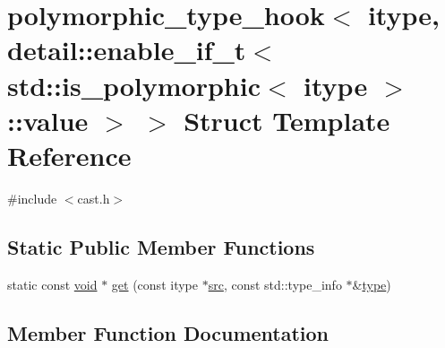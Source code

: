 \hypertarget{structpolymorphic__type__hook_3_01itype_00_01detail_1_1enable__if__t_3_01std_1_1is__polymorphic_0beb76cac8a80692d7d7a957f3b6ad63}{}\section{polymorphic\+\_\+type\+\_\+hook$<$ itype, detail\+::enable\+\_\+if\+\_\+t$<$ std\+::is\+\_\+polymorphic$<$ itype $>$\+::value $>$ $>$ Struct Template Reference}
\label{structpolymorphic__type__hook_3_01itype_00_01detail_1_1enable__if__t_3_01std_1_1is__polymorphic_0beb76cac8a80692d7d7a957f3b6ad63}


{\ttfamily \#include $<$cast.\+h$>$}

\subsection*{Static Public Member Functions}
\begin{DoxyCompactItemize}
\item 
static const \mbox{\hyperlink{_s_d_l__opengles2__gl2ext_8h_ae5d8fa23ad07c48bb609509eae494c95}{void}} $\ast$ \mbox{\hyperlink{structpolymorphic__type__hook_3_01itype_00_01detail_1_1enable__if__t_3_01std_1_1is__polymorphic_0beb76cac8a80692d7d7a957f3b6ad63_a616c79b5c66408c0ccceae50504bfc1f}{get}} (const itype $\ast$\mbox{\hyperlink{_s_d_l__opengl__glext_8h_a72e0fdf0f845ded60b1fada9e9195cd7}{src}}, const std\+::type\+\_\+info $\ast$\&\mbox{\hyperlink{_s_d_l__opengl_8h_ad5ddf6fca7b585646515660e810e0188}{type}})
\end{DoxyCompactItemize}


\subsection{Member Function Documentation}
\mbox{\label{structpolymorphic__type__hook_3_01itype_00_01detail_1_1enable__if__t_3_01std_1_1is__polymorphic_0beb76cac8a80692d7d7a957f3b6ad63_a616c79b5c66408c0ccceae50504bfc1f}} 
